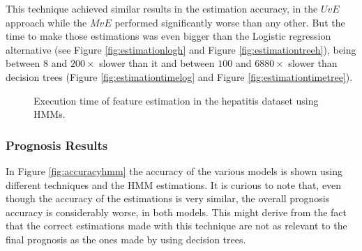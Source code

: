 This technique achieved similar results in the estimation accuracy, in the $UvE$ approach while the $MvE$ performed significantly worse than any other. But the time to make those estimations was even bigger than the Logistic regression alternative (see Figure \ref{fig:estimationlogh} and Figure \ref{fig:estimationtreeh}), being between $8$ and $200\times$ slower than it and between $100$ and $6880\times$ slower than decision trees (Figure \ref{fig:estimationtimelog} and Figure \ref{fig:estimationtimetree}).
 
 
\begin{figure}[h]
  \begin{subfigmatrix}{2}
  \end{subfigmatrix}
  \caption{Execution time of feature estimation in the hepatitis dataset using HMMs.}
  \label{fig:estimationtimehmm}
\end{figure}

\subsubsection{Prognosis Results}
\label{subsubsection:prognosis_hmm}

In Figure \ref{fig:accuracyhmm} the accuracy of the various models is shown using different techniques and the HMM estimations. It is curious to note
that, even though the accuracy of the estimations is very similar, the overall prognosis accuracy is considerably worse, in both models. This might derive from the fact that the correct estimations made with this technique are not as relevant to the final prognosis as the ones made by using decision trees. 

